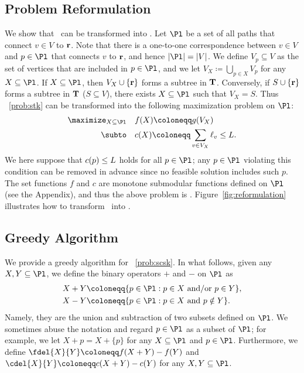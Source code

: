 \documentclass[11pt,a4paper]{article}
\begin{document}
	
	\subsection{Problem Reformulation}
	We show that \stkp\ can be transformed into \scskp. 
	Let $\Pl$ be a set of all paths that connect $v\in V$ to ${\bf r}$.  
	Note that there is a one-to-one correspondence between $v\in V$ 
	and $p\in\Pl$ that connects $v$ to ${\bf r}$, 
	and hence $|\Pl|=|V|$.  
	We define $V_p\subseteq V$ 
	as the set of vertices that are included in $p\in \Pl$, 
	and we let $V_X\coloneqq \bigcup_{p\in X} V_p$ for any $X\subseteq \Pl$. 
	If $X\subseteq \Pl$, then $V_X\cup\{{\bf r}\}$ forms a subtree in ${\bf T}$. 
	Conversely, if $S\cup\{{\bf r}\}$ forms a subtree in ${\bf T}$ ($S\subseteq V$), 
	there exists $X\subseteq \Pl$ such that $V_X=S$. 
	Thus \stkp~\eqref{prob:stk} can be transformed into the following 
	maximization problem on $\Pl$: 
	\begin{align}\label{prob:scsk}
		\maximize_{X\subseteq \Pl}\quad  & f(X)\coloneqq g(V_X) \\
		\subto\quad  & c(X)\coloneqq \sum_{v\in V_X} \l_v\le \L. \nonumber   
	\end{align}
	We here suppose that 
	$c(p)\le L$ holds for all $p\in \Pl$; 
	any $p\in \Pl$ violating this condition 
	can be removed in advance since 
	no feasible solution includes such $p$.  
	The set functions $f$ and $c$ are 
	monotone submodular functions defined on $\Pl$ 
	(see the Appendix),  
	and thus the above problem is \scskp. 
	Figure~\ref{fig:reformulation} illustrates 
	how to transform \stkp\ into \scskp. 
	
	
	
	
	\subsection{Greedy Algorithm}
	
	We provide a greedy algorithm for \scskp~\eqref{prob:scsk}. 
	In what follows, 
	given any $X,Y\subseteq \Pl$,  
	we define the binary operators $+$ and $-$ on $\Pl$ as 
	\begin{align*}
		X+Y&\coloneqq \{p\in\Pl: p\in X \text{ and/or } p\in Y \}, \\ 
		X-Y&\coloneqq \{p\in\Pl: p\in X \text{ and } p\notin Y \}. 
	\end{align*}
	Namely, they are the union and subtraction of
	two subsets defined on $\Pl$.  
	We sometimes abuse the notation and regard $p\in\Pl$ as a subset of $\Pl$; 
	for example, we let $X+p=X+\{p\}$ for any $X\subseteq \Pl$ and $p\in\Pl$. 
	Furthermore, we define $\fdel{X}{Y}\coloneqq f(X+Y)-f(Y)$ and $\cdel{X}{Y}\coloneqq c(X+Y)-c(Y)$ for any $X,Y\subseteq \Pl$. 
	
\end{document}
